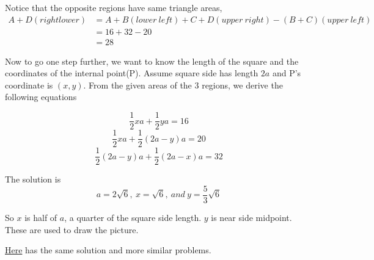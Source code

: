 \documentclass[12pt]{simple_doc}
\begin{document}
    Notice that the opposite regions have same triangle areas,
    \begin{equation*}
		\begin{aligned}
            A + D (right lower) &= A + B (lower\ left) + C + D (upper\ right) - (B + C) (upper\ left)\\
                                &= 16 + 32 - 20\\
                                &= 28
        \end{aligned}
	\end{equation*}

    Now to go one step further, we want to know the length of the square and the coordinates of the
    internal point(P). Assume square side has length $2a$ and P's coordinate is $(x, y)$. From the given
    areas of the 3 regions, we derive the following equations

    \begin{equation*} %
        \frac{1}{2} xa + \frac{1}{2} ya = 16
    \end{equation*}
    \begin{equation*}
        \frac{1}{2} xa + \frac{1}{2} (2a-y)a = 20
    \end{equation*}
    \begin{equation*}
        \frac{1}{2} (2a-y)a + \frac{1}{2} (2a-x)a = 32
    \end{equation*}

    The solution is
    \begin{equation*}
        a = 2\sqrt{6},\ x = \sqrt{6},\ and\ y = \frac{5}{3}\sqrt{6}
    \end{equation*}

    So $x$ is half of $a$, a quarter of the square side length. $y$ is near side midpoint.
    These are used to draw the picture.

    \href{https://mindyourdecisions.com/blog/2018/07/26/solve-for-the-shaded-area-you-should-be-able-to-solve-this/}{Here}
    has the same solution and more similar problems.
\end{document}
